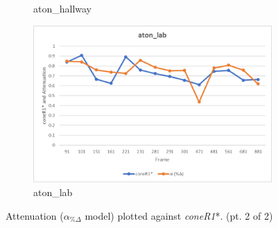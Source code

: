 \begin{appendices}
\begin{figure}
\begin{subfigure}{.45\linewidth}
  \caption{aton\_hallway}
\end{subfigure}
\hfill
\begin{subfigure}{.45\linewidth}
  \includegraphics[width=1\linewidth]{figures/appendix/lab_rgb.jpg}
  \caption{aton\_lab}
\end{subfigure}
\caption{Attenuation ($\alpha_{\%\Delta}$ model) plotted against \textit{coneR1}*. (pt. 2 of 2)}

\end{figure}

\clearpage
\FloatBarrier
\begin{figure}


\end{figure}
\end{appendices}
